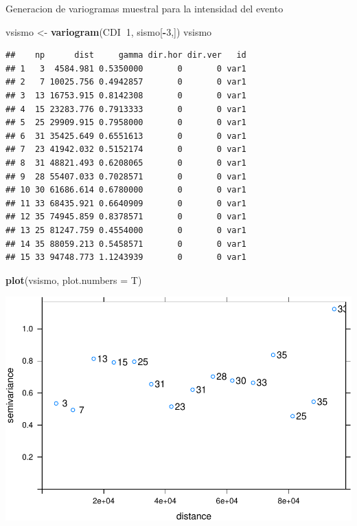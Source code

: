 \documentclass[11pt,]{article}
\newenvironment{Shaded}{\begin{snugshade}}{\end{snugshade}}
\newcommand{\KeywordTok}[1]{\textcolor[rgb]{0.13,0.29,0.53}{\textbf{#1}}}
\newcommand{\DataTypeTok}[1]{\textcolor[rgb]{0.13,0.29,0.53}{#1}}
\newcommand{\DecValTok}[1]{\textcolor[rgb]{0.00,0.00,0.81}{#1}}
\newcommand{\StringTok}[1]{\textcolor[rgb]{0.31,0.60,0.02}{#1}}
\newcommand{\OperatorTok}[1]{\textcolor[rgb]{0.81,0.36,0.00}{\textbf{#1}}}
\newcommand{\NormalTok}[1]{#1}
\begin{document}
Generacion de variogramas muestral para la intensidad del evento

\begin{Shaded}
\begin{Highlighting}[]
\NormalTok{vsismo <-}\StringTok{ }\KeywordTok{variogram}\NormalTok{(CDI}\OperatorTok{~}\DecValTok{1}\NormalTok{, sismo[}\OperatorTok{-}\DecValTok{3}\NormalTok{,])}
\NormalTok{vsismo}
\end{Highlighting}
\end{Shaded}

\begin{verbatim}
##    np      dist     gamma dir.hor dir.ver   id
## 1   3  4584.981 0.5350000       0       0 var1
## 2   7 10025.756 0.4942857       0       0 var1
## 3  13 16753.915 0.8142308       0       0 var1
## 4  15 23283.776 0.7913333       0       0 var1
## 5  25 29909.915 0.7958000       0       0 var1
## 6  31 35425.649 0.6551613       0       0 var1
## 7  23 41942.032 0.5152174       0       0 var1
## 8  31 48821.493 0.6208065       0       0 var1
## 9  28 55407.033 0.7028571       0       0 var1
## 10 30 61686.614 0.6780000       0       0 var1
## 11 33 68435.921 0.6640909       0       0 var1
## 12 35 74945.859 0.8378571       0       0 var1
## 13 25 81247.759 0.4554000       0       0 var1
## 14 35 88059.213 0.5458571       0       0 var1
## 15 33 94748.773 1.1243939       0       0 var1
\end{verbatim}

\begin{Shaded}
\begin{Highlighting}[]
\KeywordTok{plot}\NormalTok{(vsismo, }\DataTypeTok{plot.numbers =}\NormalTok{ T)}
\end{Highlighting}
\end{Shaded}

\includegraphics{proyecto_files/figure-latex/unnamed-chunk-25-1.pdf}
\end{document}
